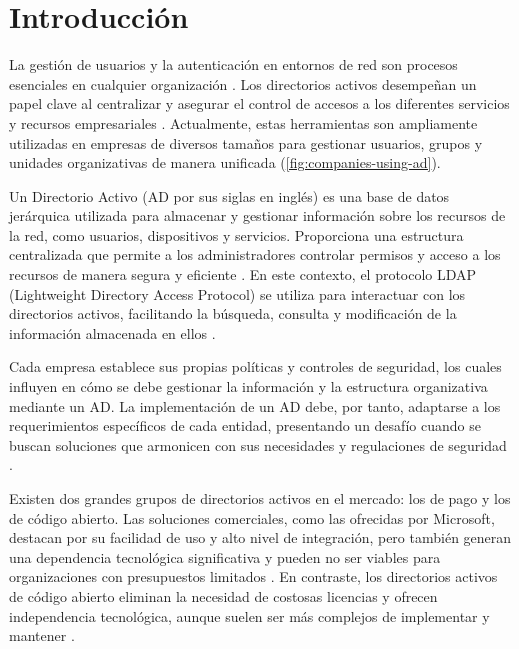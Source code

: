 \section*{Introducción}

La gestión de usuarios y la autenticación en entornos de red son procesos esenciales en cualquier organización \autocite{thakur_user_2015-1, josang_local_2015, kizza_access_2024}. Los directorios activos desempeñan un papel clave al centralizar y asegurar el control de accesos a los diferentes servicios y recursos empresariales \autocite{kizza_access_2024}. Actualmente, estas herramientas son ampliamente utilizadas en empresas de diversos tamaños para gestionar usuarios, grupos y unidades organizativas de manera unificada (\autoref{fig:companies-using-ad}).

Un Directorio Activo (AD por sus siglas en inglés) es una base de datos jerárquica utilizada para almacenar y gestionar información sobre los recursos de la red, como usuarios, dispositivos y servicios. Proporciona una estructura centralizada que permite a los administradores controlar permisos y acceso a los recursos de manera segura y eficiente  \autocite{harrison_lightweight_2006,thakur_user_2015,carter_ldap_2003}. En este contexto, el protocolo LDAP (Lightweight Directory Access Protocol) se utiliza para interactuar con los directorios activos, facilitando la búsqueda, consulta y modificación de la información almacenada en ellos \autocite{harrison_lightweight_2006,sermersheim_lightweight_2006,bartlett_samba_2005,voglmaier_abcs_2003,redhat_what_2022,janice_ldap_2023}.

Cada empresa establece sus propias políticas y controles de seguridad, los cuales influyen en cómo se debe gestionar la información y la estructura organizativa mediante un AD. La implementación de un AD debe, por tanto, adaptarse a los requerimientos específicos de cada entidad, presentando un desafío cuando se buscan soluciones que armonicen con sus necesidades y regulaciones de seguridad \autocite{kizza_access_2024,harrison_lightweight_2006,thakur_user_2015}.

Existen dos grandes grupos de directorios activos en el mercado: los de pago y los de código abierto. Las soluciones comerciales, como las ofrecidas por Microsoft, destacan por su facilidad de uso y alto nivel de integración, pero también generan una dependencia tecnológica significativa y pueden no ser viables para organizaciones con presupuestos limitados . En contraste, los directorios activos de código abierto eliminan la necesidad de costosas licencias y ofrecen independencia tecnológica, aunque suelen ser más complejos de implementar y mantener \autocite{thakur_user_2015-1,bartlett_samba_2005,imanudin_active_2019}.


